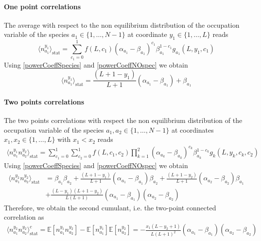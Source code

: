 \documentclass[10pt]{article}
\numberwithin{equation}{section}
\numberwithin{equation}{subsection}
\begin{document}
\paragraph{One point correlations}
The average with respect to the non equilibrium distribution of the occupation variable of the species $a_{1}\in \{1,\ldots,N-1\}$ at coordinate $y_{1}\in \{1,\ldots,L\}$ reads
\begin{equation}
	\langle n_{a_{1}}^{y_{1}}\rangle_{\text{stat}}=\sum_{c_{1}=0}^{1}f(L,c_{1})(\alpha_{a_{1}}-\beta_{a_{1}})^{c_{1}}\beta_{a_{1}}^{1-c_{1}}g_{a_{1}}(L,y_{1},c_{1})
\end{equation}
Using \eqref{powerCoeffSpecies} and \eqref{powerCoeffNOspec} we obtain 
\begin{equation}\label{one-pts-corr}
\langle n_{a_{1}}^{y_{1}}\rangle_{\text{stat}}=\frac{(L+1-y_{1})}{L+1}(\alpha_{a_{1}}-\beta_{a_{1}})+\beta_{a_{1}}
\end{equation}
\paragraph{Two points correlations}
The two points correlations with respect the non equilibrium distribution of the occupation variable of the species $a_{1},a_{2}\in \{1,\ldots,N-1\}$ at coordinates $x_{1},x_{2}\in \{1,\ldots,L\}$ with $x_{1}< x_{2}$ reads 
\begin{equation}
	\begin{split}
	\langle n_{a_{1}}^{y_{1}}n_{a_{2}}^{y_{2}}\rangle_{\text{stat}}= \sum_{c_{1}=0}^{1}\sum_{c_{2}=0}^{1}f(L,c_{1},c_{2})\prod_{k=1}^{2}(\alpha_{a_{k}}-\beta_{a_{k}})^{c_{k}}\beta_{a_{k}}^{1-c_{k}}g_{k}(L,y_{k},c_{k},c_{2})
	\end{split}
\end{equation}
Using \eqref{powerCoeffSpecies} and \eqref{powerCoeffNOspec} we obtain 
\begin{equation}
	\begin{split}
	\langle n_{a_{1}}^{y_{2}} n_{a_{2}}^{y_{2}}\rangle_{\text{stat}}&=\beta_{a_{1}}\beta_{a_{2}}+\frac{(L+1-y_{1})}{L+1}(\alpha_{a_{1}}-\beta_{a_{1}})\beta_{a_{2}}+\frac{(L+1-y_{2})}{L+1}(\alpha_{a_{2}}-\beta_{a_{2}})\beta_{a_{1}}\\&+\frac{(L-y_{1})(L+1-y_{2})}{L(L+1)}(\alpha_{a_{1}}-\beta_{a_{1}})(\alpha_{a_{2}}-\beta_{a_{2}})
	\end{split}
\end{equation}
Therefore, we obtain the second cumulant, i.e. the two-point connected correlation as 
\begin{equation}\label{two-pts-corr}
	\begin{split}
		\langle n_{a_{1}}^{y_{2}} n_{a_{2}}^{y_{2}}\rangle_{\text{stat}}^{c}=\mathbb{E}[n_{a_{1}}^{y_{1}}n_{a_{2}}^{y_{2}}]-\mathbb{E}[n_{a_{1}}^{y_{1}}]\mathbb{E}[n_{a_{2}}^{y_{2}}]=-\frac{x_{1}(L-y_{2}+1)}{L(L+1)^{2}}\left(\alpha_{a_{1}}-\beta_{a_{1}}\right)\left(\alpha_{a_{2}}-\beta_{a_{2}}\right)
	\end{split}
\end{equation}
\end{document}
